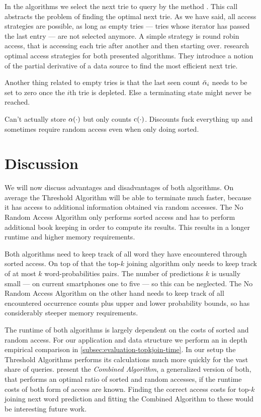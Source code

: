 In the algorithms we select the next trie to query by the method
.
This call abstracts the problem of finding the optimal next trie.
As we have said, all access strategies are possible, as long as empty tries ---
tries whose iterator has passed the last entry --- are not selected anymore.
A simple strategy is round robin access, that is accessing each trie after
another and then starting over.
\textcite{Guentzer2000,Guentzer2001} research optimal access strategies for
both presented algorithms.
They introduce a notion of the partial derivative of a data source to find the
most efficient next trie.

Another thing related to empty tries is that the last seen count
$\bar{\alpha}_i$ needs to be set to zero once the $i$th trie is depleted.
Else a terminating state might never be reached.

\begin{draft}
Can't actually store $\alpha(\cdot)$ but only counts $\operatorname{c}(\cdot)$.
Discounts fuck everything up and sometimes require random access even when only
doing sorted.
\end{draft}

\section{Discussion}

We will now discuss advantages and disadvantages of both algorithms.
On average the Threshold Algorithm will be able to terminate much faster,
because it has access to additional information obtained via random accesses.
The No Random Access Algorithm only performs sorted access and has to perform
additional book keeping in order to compute its results.
This results in a longer runtime and higher memory requirements.

Both algorithms need to keep track of all word they have encountered through
sorted access.
On top of that the top-$k$ joining algorithm only needs to keep track of at most
$k$ word-probabilities pairs.
The number of predictions $k$ is usually small --- on current smartphones one
to five --- so this can be neglected.
The No Random Access Algorithm on the other hand needs to keep track of all
encountered occurrence counts plus upper and lower probability bounds, so has
considerably steeper memory requirements.

The runtime of both algorithms is largely dependent on the costs of sorted and
random access.
For our application and data structure we perform an in depth empirical
comparison in \cref{subsec:evaluation-topkjoin-time}.
In our setup the Threshold Algorithms performs its calculations much more
quickly for the vast share of queries.
\textcite{Fagin2001} present the \emph{Combined Algorithm}, a generalized
version of both, that performs an optimal ratio of sorted and random accesses,
if the runtime costs of both form of access are known.
Finding the correct access costs for top-$k$ joining next word prediction and
fitting the Combined Algorithm to these would be interesting future work.

